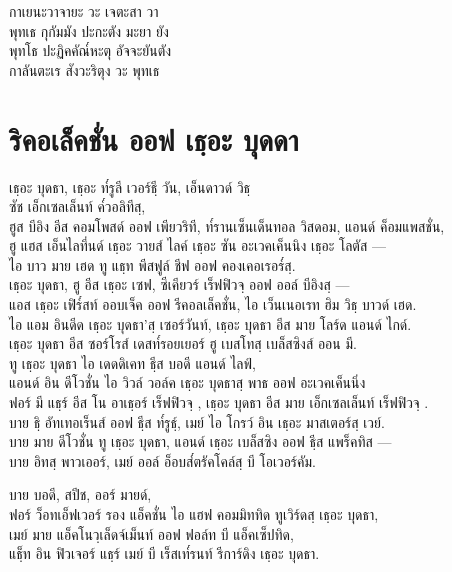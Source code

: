 กาเยนะวาจายะ วะ เจตะสา วา\\
พุทเธ กุกัมมัง ปะกะตัง มะยา ยัง\\
พุทโธ ปะฏิคคัณ๎หะตุ อัจจะยันตัง\\
กาลันตะเร สังวะริตุง วะ พุทเธ
\clearpage

\chapter{ริคอเล็คชั่น ออฟ เธฺอะ บุดดา}

\begin{leader}
\end{leader}

\begin{english}
เธฺอะ บุดธา, เธฺอะ ท๎รูลี เวอร์ธฺี วัน, เอ็นดาวด์ วิธฺ\\
ซัช เอ็กเซลเล็นท์ ค๎วอลิทีสฺ,\\
ฮูส บีอิง อีส คอมโพสด์ ออฟ เพียวริที, ท๎รานเซ็นเด็นทอล วิสดอม,
แอนด์ ค็อมแพสชั่น,\\
ฮู แฮส เอ็นไลทึ่นด์ เธฺอะ วายส์ ไลค์ เธฺอะ ซัน อะเวคเค็นนิง เธฺอะ โลตัส —\\
ไอ บาว มาย เฮด ทู แธฺท พีสฟูล์ ชีฟ ออฟ คองเคอเรอร๎สฺ.\\
เธฺอะ บุดธา, ฮู อีส เธฺอะ เซฟ, ซีเคียวร์ เร็ฟฟิวจฺ  ออฟ ออล์ บีอิงสฺ —\\
แอส เธฺอะ เฟิร๎สท์ ออบเจ็ค ออฟ รีคอลเล็คชั่น, ไอ เว็นเนอเรท ฮิม วิธฺ บาวด์ เฮด.\\
ไอ แอม อินดีด เธฺอะ บุดธา’สฺ เซอร์วันท์, เธฺอะ บุดธา อีส มาย โลร์ด แอนด์ ไกด์.\\
เธฺอะ บุดธา อีส ซอร์โรส์ เดสท๎รอยเยอร์ ฮู   เบสโทสฺ  เบล็สซิงส์ ออน มี.\\
ทู เธฺอะ บุดธา ไอ เดดดิเคท ธฺีส บอดี แอนด์ ไลฟ์,\\
แอนด์ อิน ดีโวชั่น ไอ วิวล์ วอล์ค เธฺอะ บุดธาสฺ  พาธ ออฟ อะเวคเค็นนิ่ง\\
ฟอร์ มี แธฺร์ อีส โน อาเธฺอร์ เร็ฟฟิวจฺ , เธฺอะ บุดธา อีส มาย เอ็กเซลเล็นท์ เร็ฟฟิวจฺ .\\
บาย ธฺิ อัทเทอเร็นส์ ออฟ ธฺีส ท๎รูธฺ์, เมย์ ไอ โกรว์ อิน เธฺอะ มาสเตอร์สฺ  เวย์.\\
บาย มาย ดีโวชั่น ทู เธฺอะ บุดธา, แอนด์ เธฺอะ เบล็สซิง ออฟ ธฺีส แพร็คทิส —\\
บาย อิทสฺ  พาวเออร์, เมย์ ออล์ อ็อบส๎ตรัคโคล์สฺ บี โอเวอร์คัม.\\


บาย บอดี, สปีช, ออร์ มายด์,\\
ฟอร์ ว็อทเอ็ฟเวอร์ รอง แอ็คชั่น ไอ แฮฟ คอมมิททิด ทูเวิร์ดสฺ  เธฺอะ บุดธา,\\
เมย์ มาย แอ็คโนวฺเล็ดจ์เม็นท์ ออฟ ฟอล์ท บี แอ็คเซ็ปทิด,\\
แธฺ็ท อิน ฟิวเจอร์ แธฺร์ เมย์ บี เร็สเท๎รนท์ รีการ์ดิง เธฺอะ บุดธา.\\
\end{english}
\clearpage
